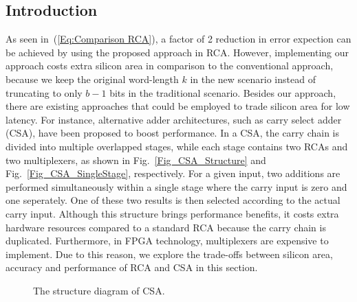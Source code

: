 \documentclass[prodmode,acmtrets]{acmsmall} %
\begin{document}
\subsection{Introduction}
As seen in~(\ref{Eq:Comparison RCA}), a factor of 2 reduction in error expection can be achieved by using the proposed approach in RCA. However, implementing our approach costs extra silicon area in comparison to the conventional approach, because we keep the original word-length $k$ in the new scenario instead of truncating to only $b-1$ bits in the traditional scenario. Besides our approach, there are existing approaches that could be employed to trade silicon area for low latency. For instance, alternative adder architectures, such as carry select adder (CSA), have been proposed to boost performance. In a CSA, the carry chain is divided into multiple overlapped stages, while each stage contains two RCAs and two multiplexers, as shown in Fig.~\ref{Fig_CSA_Structure} and Fig.~\ref{Fig_CSA_SingleStage}, respectively. For a given input, two additions are performed simultaneously within a single stage where the carry input is zero and one seperately. One of these two results is then selected according to the actual carry input. Although this structure brings performance benefits, it costs extra hardware resources compared to a standard RCA because the carry chain is duplicated. Furthermore, in FPGA technology, multiplexers are expensive to implement. Due to this reason, we explore the trade-offs between silicon area, accuracy and performance of RCA and CSA in this section.
\vspace{-7ex}
\begin{figure}[htbp]
        \centering
    \caption{The structure diagram of CSA.}
\end{figure}
\vspace{-2ex}
\end{document}
